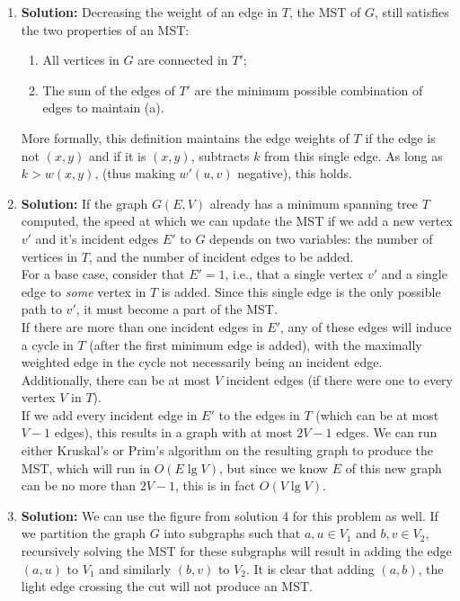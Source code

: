 \documentclass{article}
\begin{document}
\begin{enumerate}
\begin{figure}[!h]
\end{figure}

\item \textbf{Solution:} 
Decreasing the weight of an edge in $T$, the MST of $G$, still satisfies the two properties of an MST:
\begin{enumerate}
    \item All vertices in $G$ are connected in $T'$;
    \item The sum of the edges of $T'$ are the minimum possible combination of edges to maintain (a).
\end{enumerate}
More formally, this definition maintains the edge weights of $T$ if the edge is not $(x,y)$ and if it is $(x,y)$, subtracts $k$ from this single edge. As long as $k > w(x,y)$, (thus making $w'(u,v)$ negative), this holds.

\item \textbf{Solution:} 
If the graph $G(E,V)$ already has a minimum spanning tree $T$ computed, the speed at which we can update the MST if we add a new vertex $v'$ and it's incident edges $E'$ to $G$ depends on two variables: the number of vertices in $T$, and the number of incident edges to be added.\\
For a base case, consider that $E'=1$, i.e., that a single vertex $v'$ and a single edge to \emph{some} vertex in $T$ is added. Since this single edge is the only possible path to $v'$, it must become a part of the MST.\\
If there are more than one incident edges in $E'$, any of these edges will induce a cycle in $T$ (after the first minimum edge is added), with the maximally weighted edge in the cycle not necessarily being an incident edge. Additionally, there can be at most $V$ incident edges (if there were one to every vertex $V$ in $T$). \\
If we add every incident edge in $E'$ to the edges in $T$ (which can be at most $V-1$ edges), this results in a graph with at most $2V-1$ edges. We can run either Kruskal's or Prim's algorithm on the resulting graph to produce the MST, which will run in $O(E\lg{V})$, but since we know $E$ of this new graph can be no more than $2V-1$, this is in fact $O(V\lg{V})$.

\item \textbf{Solution:}
We can use the figure from solution 4 for this problem as well. If we partition the graph $G$ into subgraphs such that ${a, u} \in V_{1}$ and ${b, v} \in V_{2}$, recursively solving the MST for these subgraphs will result in adding the edge $(a,u)$ to $V_{1}$ and similarly $(b,v)$ to $V_{2}$. It is clear that adding $(a,b)$, the light edge crossing the cut will not produce an MST.

\end{enumerate}
\end{document}

